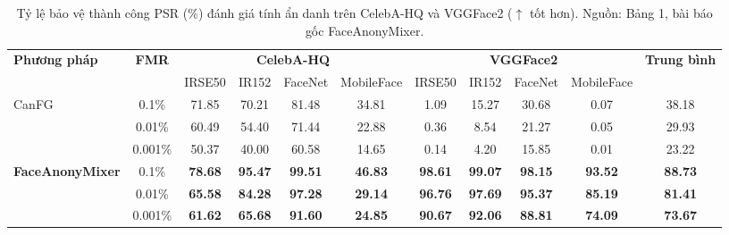 \begin{table}[H]
\centering
\scriptsize
\setlength{\tabcolsep}{3.5pt}
\caption{Tỷ lệ bảo vệ thành công PSR (\%) đánh giá tính ẩn danh trên CelebA-HQ và VGGFace2 ($\uparrow$ tốt hơn). Nguồn: Bảng 1, bài báo gốc FaceAnonyMixer.}
\label{tab:anonymity_psr}
\begin{tabular}{|l|c|cccc|cccc|c|}
\hline
\multirow{2}{*}{\textbf{Phương pháp}} & \multirow{2}{*}{\textbf{FMR}} & \multicolumn{4}{c|}{\textbf{CelebA-HQ}} & \multicolumn{4}{c|}{\textbf{VGGFace2}} & \multirow{2}{*}{\textbf{Trung bình}} \\
\cline{3-10}
 & & IRSE50 & IR152 & FaceNet & MobileFace & IRSE50 & IR152 & FaceNet & MobileFace & \\
\hline
\multirow{3}{*}{CanFG} & 0.1\% & 71.85 & 70.21 & 81.48 & 34.81 & 1.09 & 15.27 & 30.68 & 0.07 & 38.18 \\
 & 0.01\% & 60.49 & 54.40 & 71.44 & 22.88 & 0.36 & 8.54 & 21.27 & 0.05 & 29.93 \\
 & 0.001\% & 50.37 & 40.00 & 60.58 & 14.65 & 0.14 & 4.20 & 15.85 & 0.01 & 23.22 \\
\hline
\multirow{3}{*}{\textbf{FaceAnonyMixer}} & 0.1\% & \textbf{78.68} & \textbf{95.47} & \textbf{99.51} & \textbf{46.83} & \textbf{98.61} & \textbf{99.07} & \textbf{98.15} & \textbf{93.52} & \textbf{88.73} \\
 & 0.01\% & \textbf{65.58} & \textbf{84.28} & \textbf{97.28} & \textbf{29.14} & \textbf{96.76} & \textbf{97.69} & \textbf{95.37} & \textbf{85.19} & \textbf{81.41} \\
 & 0.001\% & \textbf{61.62} & \textbf{65.68} & \textbf{91.60} & \textbf{24.85} & \textbf{90.67} & \textbf{92.06} & \textbf{88.81} & \textbf{74.09} & \textbf{73.67} \\
\hline
\end{tabular}
\end{table}

